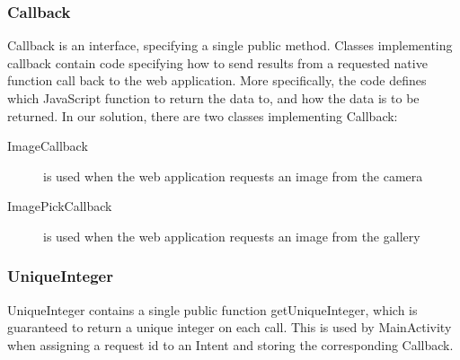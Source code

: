 \subsubsection{Callback} 
Callback is an interface, specifying a single public method. Classes implementing callback contain code specifying how to send results from a requested native function call back to the web application. More specifically, the code defines which JavaScript function to return the data to, and how the data is to be returned. In our solution, there are two classes implementing Callback:
	\begin{description}
		\item[ImageCallback] is used when the web application requests an image from the camera
		
		\item[ImagePickCallback] is used when the web application requests an image from the gallery
	\end{description}
		
\subsubsection{UniqueInteger} 
UniqueInteger contains a single public function getUniqueInteger, which is guaranteed to return a unique integer on each call. This is used by MainActivity when assigning a request id to an Intent and storing the corresponding Callback.

